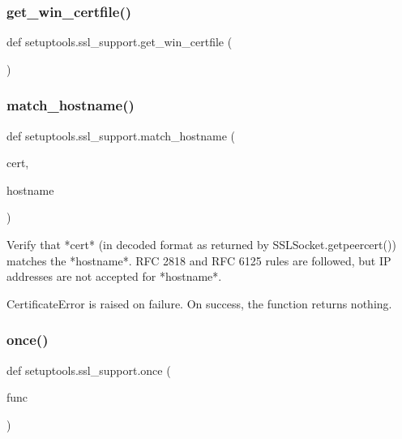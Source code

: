 \subsubsection{\texorpdfstring{get\+\_\+win\+\_\+certfile()}{get\_win\_certfile()}}
{\footnotesize\ttfamily def setuptools.\+ssl\+\_\+support.\+get\+\_\+win\+\_\+certfile (\begin{DoxyParamCaption}{ }\end{DoxyParamCaption})}

\mbox{\label{namespacesetuptools_1_1ssl__support_af946fca9376289edb47b2e1babe9f9ee}} 
\subsubsection{\texorpdfstring{match\+\_\+hostname()}{match\_hostname()}}
{\footnotesize\ttfamily def setuptools.\+ssl\+\_\+support.\+match\+\_\+hostname (\begin{DoxyParamCaption}\item[{}]{cert,  }\item[{}]{hostname }\end{DoxyParamCaption})}

\begin{DoxyVerb}Verify that *cert* (in decoded format as returned by
SSLSocket.getpeercert()) matches the *hostname*.  RFC 2818 and RFC 6125
rules are followed, but IP addresses are not accepted for *hostname*.

CertificateError is raised on failure. On success, the function
returns nothing.
\end{DoxyVerb}
 \mbox{\label{namespacesetuptools_1_1ssl__support_af8ea87b3644184df3df0bbda2f796ed5}} 
\subsubsection{\texorpdfstring{once()}{once()}}
{\footnotesize\ttfamily def setuptools.\+ssl\+\_\+support.\+once (\begin{DoxyParamCaption}\item[{}]{func }\end{DoxyParamCaption})}

